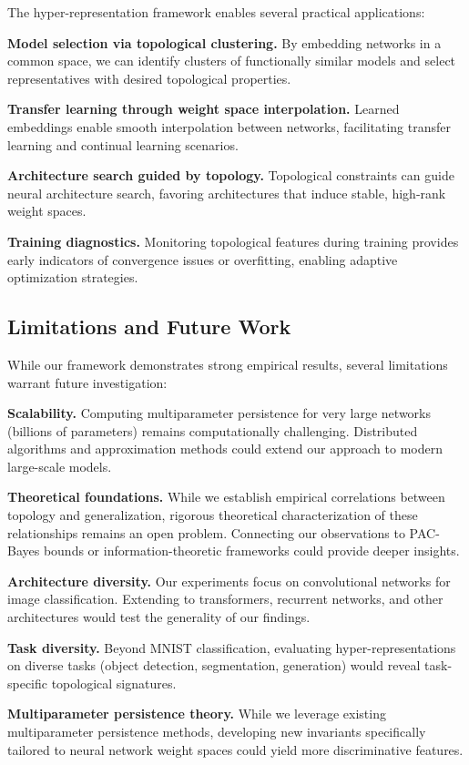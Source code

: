 The hyper-representation framework enables several practical applications:

\textbf{Model selection via topological clustering.} By embedding networks in a common space, we can identify clusters of functionally similar models and select representatives with desired topological properties.

\textbf{Transfer learning through weight space interpolation.} Learned embeddings enable smooth interpolation between networks, facilitating transfer learning and continual learning scenarios.

\textbf{Architecture search guided by topology.} Topological constraints can guide neural architecture search, favoring architectures that induce stable, high-rank weight spaces.

\textbf{Training diagnostics.} Monitoring topological features during training provides early indicators of convergence issues or overfitting, enabling adaptive optimization strategies.

\subsection{Limitations and Future Work}

While our framework demonstrates strong empirical results, several limitations warrant future investigation:

\textbf{Scalability.} Computing multiparameter persistence for very large networks (billions of parameters) remains computationally challenging. Distributed algorithms and approximation methods could extend our approach to modern large-scale models.

\textbf{Theoretical foundations.} While we establish empirical correlations between topology and generalization, rigorous theoretical characterization of these relationships remains an open problem. Connecting our observations to PAC-Bayes bounds or information-theoretic frameworks could provide deeper insights.

\textbf{Architecture diversity.} Our experiments focus on convolutional networks for image classification. Extending to transformers, recurrent networks, and other architectures would test the generality of our findings.

\textbf{Task diversity.} Beyond MNIST classification, evaluating hyper-representations on diverse tasks (object detection, segmentation, generation) would reveal task-specific topological signatures.

\textbf{Multiparameter persistence theory.} While we leverage existing multiparameter persistence methods, developing new invariants specifically tailored to neural network weight spaces could yield more discriminative features.

